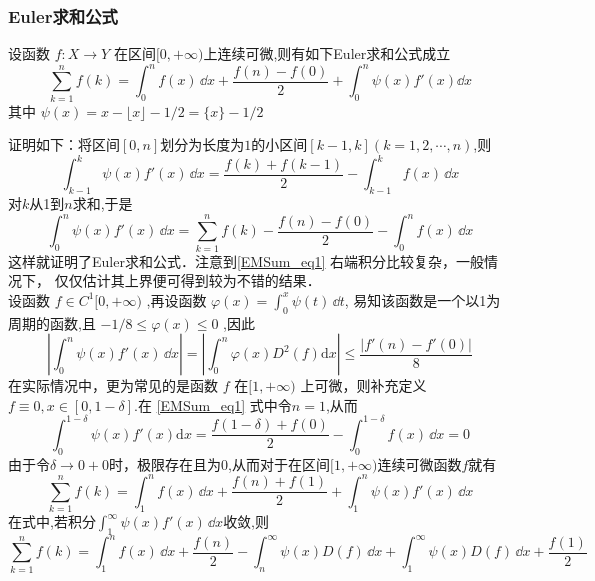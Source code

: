 
\subsubsection{Euler求和公式}
\begin{theorem}{}
    设函数 $f:X\to Y$ 在区间$[0,+\infty)$上连续可微,则有如下Euler求和公式成立	
        \begin{equation}\label{EMSum_eq1} 
            \sum_{k=1}^{n}f(k)=\int_{0}^{n}f(x)\,\dd x
            +\frac{f(n)-f(0)}{2}+\int_{0}^{n}\psi(x)f'(x)\dd x
        \end{equation}
    其中 $\psi(x)=x-\lfloor x \rfloor-1/2=\{x\}-1/2$
\end{theorem}
证明如下：将区间$[0,n]$划分为长度为$1$的小区间$[k-1,k](k=1,2,\cdots,n)$,则
​\[
    \int_{k-1}^{k}\psi(x)f'(x)\,\dd x
    =\frac{f(k)+f(k-1)}{2}-\int_{k-1}^{k}f(x)\,\dd x
\]
​对$k$从1到$n$求和,于是
​\[
    \int_{0}^{n}\psi(x)f'(x)\,\dd x
    =\sum_{k=1}^{n}f(k)-\frac{f(n)-f(0)}{2}-\int_{0}^{n}f(x)\,\dd x
\]
这样就证明了Euler求和公式．注意到\autoref{EMSum_eq1} 右端积分比较复杂，一般情况下，
仅仅估计其上界便可得到较为不错的结果．\\
设函数 $f\in{C^1[0,+\infty)}$ ,再设函数
$\varphi(x)=\displaystyle{\int_{0}^{x}\psi(t\label{EMSum_eq2})\,\dd t}$,
易知该函数是一个以1为周期的函数,且
 $-1/8\leqslant\varphi(x)\leqslant 0$ ,因此
\[
    \left|\int_{0}^{n}\psi(x)f'(x)\,\dd x\right|
    =\left|\int_{0}^{n}\varphi(x)D^2(f)\mathrm{d}x\right|
    \leqslant\frac{|f'(n)-f'(0)|}{8}
\]
在实际情况中，更为常见的是函数 $f$ 在$[1,+\infty)$ 上可微，则补充定义$ f\equiv 0,x\in[0,1-\delta]$.在 \autoref{EMSum_eq1} 式中令$n=1$,从而
\[
    \int_{0}^{1-\delta}\psi(x)f'(x)\mathrm{d}x
    =\frac{f(1-\delta)+f(0)}{2}-\int_{0}^{1-\delta}f(x)\,\dd x=0
\]
由于令$\delta\to0+0$时，极限存在且为$0$,从而对于在区间$[1,+\infty)$连续可微函数$f$就有
\begin{equation}
    \sum_{k=1}^{n}f(k)
    =\int_{1}^{n}f(x)\,\dd x+\frac{f(n)+f(1)}{2}+\int_{1}^{n}\psi(x)f'(x)\,\dd x
\end{equation}
在式中,若积分$\displaystyle{\int_{1}^{\infty}\psi(x)f'(x)\,\dd x}$收敛,则
\begin{equation}
    \sum_{k=1}^{n}f(k)=\int_{1}^{n}f(x)\,\dd x+\frac{f(n)}{2}
    -\int_{n}^{\infty}\psi(x)D(f)\,\dd x
    +\int_{1}^{\infty}\psi(x)D(f)\,\dd x+\frac{f(1)}{2}
\end{equation}